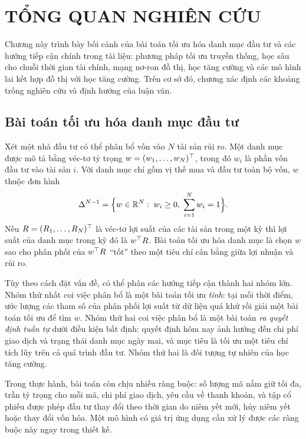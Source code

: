 \chapter{TỔNG QUAN NGHIÊN CỨU}
\label{ch:tongquan}

Chương này trình bày bối cảnh của bài toán tối ưu hóa danh mục đầu tư và các hướng tiếp cận chính trong tài liệu: phương pháp tối ưu truyền thống, học sâu cho chuỗi thời gian tài chính, mạng nơ-ron đồ thị, học tăng cường và các mô hình lai kết hợp đồ thị với học tăng cường. Trên cơ sở đó, chương xác định các khoảng trống nghiên cứu và định hướng của luận văn.

\section{Bài toán tối ưu hóa danh mục đầu tư}

Xét một nhà đầu tư có thể phân bổ vốn vào $N$ tài sản rủi ro. Một danh mục được mô tả bằng véc-tơ tỷ trọng $w=(w_1,\dots,w_N)^{\top}$, trong đó $w_i$ là phần vốn đầu tư vào tài sản $i$. Với danh mục chỉ gồm vị thế mua và đầu tư toàn bộ vốn, $w$ thuộc đơn hình
\begin{equation}
\Delta^{N-1}=\Big\{w\in\mathbb{R}^N:\; w_i\ge 0,\; \sum_{i=1}^{N} w_i=1\Big\}.
\end{equation}
Nếu $R=(R_1,\dots,R_N)^{\top}$ là véc-tơ lợi suất của các tài sản trong một kỳ thì lợi suất của danh mục trong kỳ đó là $w^{\top} R$. Bài toán tối ưu hóa danh mục là chọn $w$ sao cho phân phối của $w^{\top} R$ ``tốt'' theo một tiêu chí cân bằng giữa lợi nhuận và rủi ro.

Tùy theo cách đặt vấn đề, có thể phân các hướng tiếp cận thành hai nhóm lớn. Nhóm thứ nhất coi việc phân bổ là một bài toán tối ưu \emph{tĩnh}: tại mỗi thời điểm, ước lượng các tham số của phân phối lợi suất từ dữ liệu quá khứ rồi giải một bài toán tối ưu để tìm $w$. Nhóm thứ hai coi việc phân bổ là một bài toán \emph{ra quyết định tuần tự} dưới điều kiện bất định: quyết định hôm nay ảnh hưởng đến chi phí giao dịch và trạng thái danh mục ngày mai, và mục tiêu là tối ưu một tiêu chí tích lũy trên cả quá trình đầu tư. Nhóm thứ hai là đối tượng tự nhiên của học tăng cường.

Trong thực hành, bài toán còn chịu nhiều ràng buộc: số lượng mã nắm giữ tối đa, trần tỷ trọng cho mỗi mã, chi phí giao dịch, yêu cầu về thanh khoản, và tập cổ phiếu được phép đầu tư thay đổi theo thời gian do niêm yết mới, hủy niêm yết hoặc thay đổi vốn hóa. Một mô hình có giá trị ứng dụng cần xử lý được các ràng buộc này ngay trong thiết kế.


